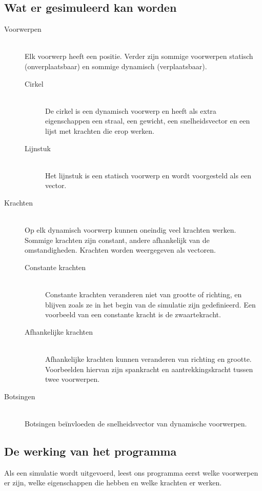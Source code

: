 \documentclass[12pt,a4paper]{article}
\begin{document}
	\subsection{Wat er gesimuleerd kan worden}
	\begin{description}
  		\item[Voorwerpen] \hfill \\
  			Elk voorwerp heeft een positie. Verder zijn sommige voorwerpen statisch (onverplaatsbaar) en sommige dynamisch (verplaatsbaar).
			\begin{description}
				\item[Cirkel] \hfill \\
					De cirkel is een dynamisch voorwerp en heeft als extra eigenschappen een straal, een gewicht, een snelheidsvector en een lijst met krachten die erop werken.
				
				\item[Lijnstuk] \hfill \\
					Het lijnstuk is een statisch voorwerp en wordt voorgesteld als een vector.
			\end{description}
		\item[Krachten] \hfill \\
			Op elk dynamisch voorwerp kunnen oneindig veel krachten werken. Sommige krachten zijn constant, andere afhankelijk van de omstandigheden. Krachten worden weergegeven als vectoren.
			\begin{description}
				\item[Constante krachten] \hfill \\
					Constante krachten veranderen niet van grootte of richting, en blijven zoals ze in het begin van de simulatie zijn gedefinieerd. Een voorbeeld van een constante kracht is de zwaartekracht.
				\item[Afhankelijke krachten] \hfill \\
					Afhankelijke krachten kunnen veranderen van richting en grootte. Voorbeelden hiervan zijn spankracht en aantrekkingskracht tussen twee voorwerpen.
			\end{description}
		\item[Botsingen] \hfill \\
			Botsingen be\"{i}nvloeden de snelheidsvector van dynamische voorwerpen.
	\end{description}
	
	\subsection{De werking van het programma}
	\label{werking-van-het-programma}
	Als een simulatie wordt uitgevoerd, leest ons programma eerst welke voorwerpen er zijn, welke eigenschappen die hebben en welke krachten er werken.
	
\end{document}
